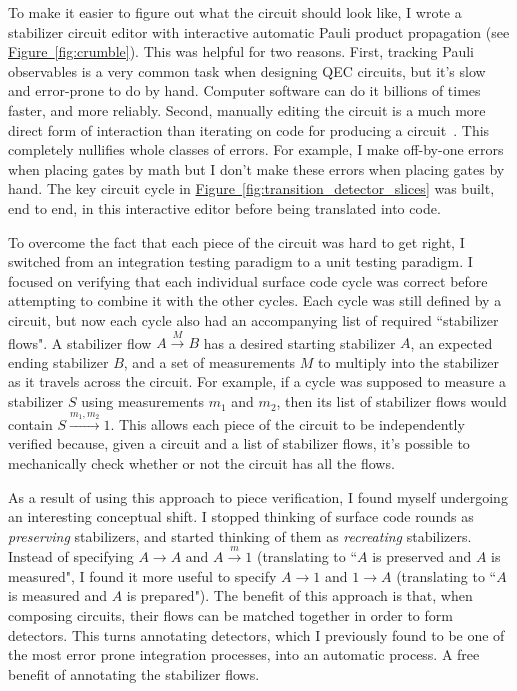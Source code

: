 \documentclass[onecolumn,unpublished,a4paper]{quantumarticle}
\theoremstyle{definition}
\theoremstyle{definition}
\theoremstyle{definition}
\newcommand{\fig}[1]{\hyperref[fig:#1]{Figure~\ref*{fig:#1}}}
\begin{document}
To make it easier to figure out what the circuit should look like, I wrote a stabilizer circuit editor with interactive automatic Pauli product propagation (see \fig{crumble}).
This was helpful for two reasons.
First, tracking Pauli observables is a very common task when designing QEC circuits, but it's slow and error-prone to do by hand.
Computer software can do it billions of times faster, and more reliably.
Second, manually editing the circuit is a much more direct form of interaction than iterating on code for producing a circuit~\cite{brettvictormediaforthinking2013}.
This completely nullifies whole classes of errors.
For example, I make off-by-one errors when placing gates by math but I don't make these errors when placing gates by hand.
The key circuit cycle in \fig{transition_detector_slices} was built, end to end, in this interactive editor before being translated into code.

To overcome the fact that each piece of the circuit was hard to get right, I switched from an integration testing paradigm to a unit testing paradigm.
I focused on verifying that each individual surface code cycle was correct before attempting to combine it with the other cycles.
Each cycle was still defined by a circuit, but now each cycle also had an accompanying list of required ``stabilizer flows".
A stabilizer flow $A \xrightarrow{M} B$ has a desired starting stabilizer $A$, an expected ending stabilizer $B$, and a set of measurements $M$ to multiply into the stabilizer as it travels across the circuit.
For example, if a cycle was supposed to measure a stabilizer $S$ using measurements $m_1$ and $m_2$, then its list of stabilizer flows would contain $S \xrightarrow{m_1, m_2} 1$.
This allows each piece of the circuit to be independently verified because, given a circuit and a list of stabilizer flows, it's possible to mechanically check whether or not the circuit has all the flows.

As a result of using this approach to piece verification, I found myself undergoing an interesting conceptual shift.
I stopped thinking of surface code rounds as \emph{preserving} stabilizers, and started thinking of them as \emph{recreating} stabilizers.
Instead of specifying $A \rightarrow A$ and $A \xrightarrow{m} 1$ (translating to ``$A$ is preserved and $A$ is measured", I found it more useful to specify $A \rightarrow 1$ and $1 \rightarrow A$ (translating to ``$A$ is measured and $A$ is prepared").
The benefit of this approach is that, when composing circuits, their flows can be matched together in order to form detectors.
This turns annotating detectors, which I previously found to be one of the most error prone integration processes, into an automatic process.
A free benefit of annotating the stabilizer flows.
\end{document}

